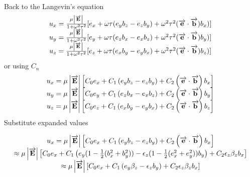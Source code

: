 \documentclass[12pt]{article} %
\begin{document}
Back to the Langevin's equation
\begin{equation*} 
\begin{matrix}
u_{x} = 
\frac{\mu \left| \overrightarrow{\mathbf{E}} \right|}{1 + \omega^2\tau^2} 
[ e_{x} + \omega \tau (e_{y} b_{z} - e_{z} b_{y}) + \omega^2 \tau^2 ( \overrightarrow{\mathbf{e}} \cdot  \overrightarrow{\mathbf{b}}) b_{x}) ] \cr
u_{y} = 
\frac{\mu \left| \overrightarrow{\mathbf{E}} \right|}{1 + \omega^2\tau^2} 
[ e_{y} + \omega \tau (e_{z} b_{x} - e_{x} b_{z}) + \omega^2 \tau^2 ( \overrightarrow{\mathbf{e}} \cdot  \overrightarrow{\mathbf{b}}) b_{y}) ] \cr
u_{z} = 
\frac{\mu \left| \overrightarrow{\mathbf{E}} \right|}{1 + \omega^2\tau^2} 
[  e_{z} + \omega \tau (e_{x} b_{y} - e_{y} b_{x}) + \omega^2 \tau^2 ( \overrightarrow{\mathbf{e}} \cdot  \overrightarrow{\mathbf{b}}) b_{z}) ] \cr
\end{matrix}
\end{equation*}
or using $C_{n}$
\begin{equation*} 
\begin{matrix}
u_{x} = 
\mu \left| \overrightarrow{ \mathbf{E} }\right| 
\left[ C_{0} e_{x} + C_{1} \left(e_{y} b_{z} - e_{z} b_{y}\right) + C_{2} \left( \overrightarrow{\mathbf{e}} \cdot  \overrightarrow{\mathbf{b}} \right) b_{x} \right] \cr
u_{y} = 
\mu \left| \overrightarrow{ \mathbf{E} }\right| 
\left[ C_{0} e_{y} + C_{1} \left(e_{z} b_{x} - e_{x} b_{z}\right) + C_{2} \left( \overrightarrow{\mathbf{e}} \cdot  \overrightarrow{\mathbf{b}} \right) b_{y} \right] \cr
u_{z} = 
\mu \left| \overrightarrow{ \mathbf{E} } \right| 
\left[ C_{0} e_{z} + C_{1} \left(e_{x} b_{y} - e_{y} b_{x}\right) + C_{2} \left( \overrightarrow{\mathbf{e}} \cdot  \overrightarrow{\mathbf{b}} \right) b_{z} \right] \cr
\end{matrix}
\end{equation*}
Substitute expanded values

\begin{equation}  %
\begin{matrix}
u_{x} = \mu \left| \overrightarrow{ \mathbf{E} }\right| 
\left[ C_{0} e_{x} + C_{1} \left(e_{y} b_{z} - e_{z} b_{y}\right) + C_{2} \left( \overrightarrow{\mathbf{e}} \cdot  \overrightarrow{\mathbf{b}} \right) b_{x} \right] \cr
\approx
\mu \left| \overrightarrow{ \mathbf{E} }\right| 
\left[ C_{0} e_{x}
+ C_{1} \left(e_{y}     (1 - \frac{1}{2}( b_{x}^2 + b_{y}^2)) - \epsilon_{z}  (1 - \frac{1}{2}( e_{x}^2 + e_{y}^2))  b_{y}\right)
+ C_{2} \epsilon_{z}  \beta_{z} b_{x}
\right]
\cr
\approx
\mu \left| \overrightarrow{ \mathbf{E} }\right| 
\left[ C_{0} e_{x}
 + C_{1} \left( e_{y} \beta_{z}  - \epsilon_{z}  b_{y}\right)
 + C_{2} \epsilon_{z}  \beta_{z} b_{x}
\right]
\cr
\end{matrix}
\end{equation}
\end{document}
